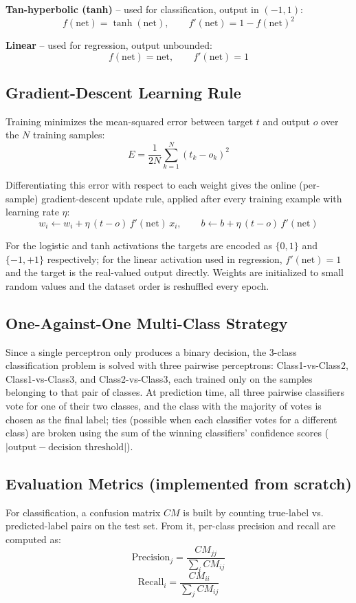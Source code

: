 \documentclass[11pt,a4paper]{article}
\begin{document}
\textbf{Tan-hyperbolic (tanh)} -- used for classification, output in $(-1,1)$:
\[
f(\mathrm{net}) = \tanh(\mathrm{net}), \qquad f'(\mathrm{net}) = 1 - f(\mathrm{net})^2
\]

\textbf{Linear} -- used for regression, output unbounded:
\[
f(\mathrm{net}) = \mathrm{net}, \qquad f'(\mathrm{net}) = 1
\]

\subsection{Gradient-Descent Learning Rule}
Training minimizes the mean-squared error between target $t$ and output $o$ over the $N$ training samples:
\[
E = \frac{1}{2N}\sum_{k=1}^{N}(t_k-o_k)^2
\]

Differentiating this error with respect to each weight gives the online (per-sample) gradient-descent update rule, applied after every training example with learning rate $\eta$:
\[
w_i \leftarrow w_i + \eta\,(t-o)\,f'(\mathrm{net})\,x_i, \qquad b \leftarrow b + \eta\,(t-o)\,f'(\mathrm{net})
\]

For the logistic and tanh activations the targets are encoded as $\{0,1\}$ and $\{-1,+1\}$ respectively; for the linear activation used in regression, $f'(\mathrm{net})=1$ and the target is the real-valued output directly. Weights are initialized to small random values and the dataset order is reshuffled every epoch.

\subsection{One-Against-One Multi-Class Strategy}
Since a single perceptron only produces a binary decision, the 3-class classification problem is solved with three pairwise perceptrons: Class1-vs-Class2, Class1-vs-Class3, and Class2-vs-Class3, each trained only on the samples belonging to that pair of classes. At prediction time, all three pairwise classifiers vote for one of their two classes, and the class with the majority of votes is chosen as the final label; ties (possible when each classifier votes for a different class) are broken using the sum of the winning classifiers' confidence scores ($|\text{output}-\text{decision threshold}|$).

\subsection{Evaluation Metrics (implemented from scratch)}
For classification, a confusion matrix $CM$ is built by counting true-label vs. predicted-label pairs on the test set. From it, per-class precision and recall are computed as:
\[
\mathrm{Precision}_j = \frac{CM_{jj}}{\sum_i CM_{ij}}
\]
\[
\mathrm{Recall}_i = \frac{CM_{ii}}{\sum_j CM_{ij}}
\]
\end{document}
